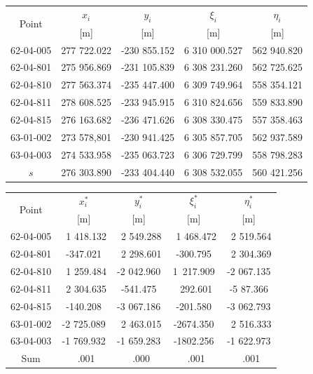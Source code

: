 \begin{table}[htbp]
	\begin{tabular}{ccccc}
		\toprule
		\multirow{2}{*}{Point} & $x_i$ & $y_i$ & $\xi_{i}$ & $\eta_i$ \\
		{} &[m] & [m] & [m] & [m]\\
		\midrule
		62-04-005 &277 722.022  &-230 855.152 & 6 310 000.527 &562 940.820\\
		62-04-801 &275 956.869  &-231 105.839 & 6 308 231.260 &562 725.625\\
		62-04-810 &277 563.374  &-235 447.400 & 6 309 749.964 &558 354.121\\
		62-04-811 &278 608.525  &-233 945.915 & 6 310 824.656 &559 833.890\\
		62-04-815 &276 163.682  &-236 471.626 & 6 308 330.475 &557 358.463\\
		63-01-002 &273 578,801  &-230 941.425 & 6 305 857.705 &562 937.589\\
		63-04-003 &274 533.958  &-235 063.723 & 6 306 729.799 &558 798.283\\
		$s$       &276 303.890  &-233 404.440 & 6 308 532.055 &560 421.256\\
		\bottomrule
	\end{tabular}
\end{table}
\begin{table}[htbp]
	\begin{tabular}{ccccc}
		\toprule
		\multirow{2}{*}{Point} & $x_{i}^{\ast}$ & $y_{i}^{\ast}$ & $\xi_{i}^{\ast}$ & $\eta_{i}^{\ast}$ \\
		{} &[m] & [m] & [m] & [m]\\
		\midrule
		62-04-005 &\ 1 418.132  &\ 2 549.288  &\ 1 468.472 &\ 2 519.564\\
		62-04-801 &-347.021     &\ 2 298.601  & -300.795   &\ 2 304.369\\
		62-04-810 &\ 1 259.484  & -2 042.960  &1\ 217.909  &-2 067.135\\
		62-04-811 &\ 2 304.635  &-541.475     &\ 292.601   &-5 87.366\\
		62-04-815 &-140.208     &-3 067.186   &-201.580    &-3 062.793\\
		63-01-002 &-2 725.089   &\ 2 463.015  &-2674.350   &\ 2 516.333\\
		63-04-003 &-1 769.932   &-1 659.283   &-1802.256   &-1 622.973\\
		Sum       &\ .001       &\ .000       &\ .001      &\ .001\\
		\bottomrule
	\end{tabular}
\end{table}
